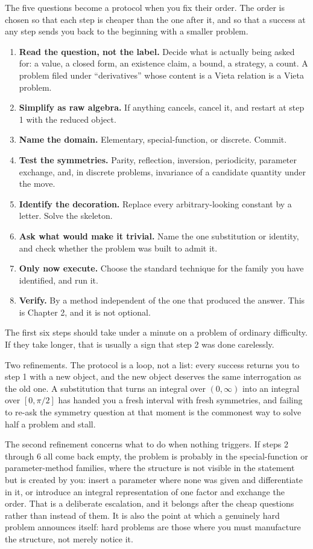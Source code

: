 The five questions become a protocol when you fix their order. The order is chosen so that each step is cheaper than the one after it, and so that a success at any step sends you back to the beginning with a smaller problem.

\begin{enumerate}
\item \textbf{Read the question, not the label.} Decide what is actually being asked for: a value, a closed form, an existence claim, a bound, a strategy, a count. A problem filed under ``derivatives'' whose content is a Vieta relation is a Vieta problem.
\item \textbf{Simplify as raw algebra.} If anything cancels, cancel it, and restart at step 1 with the reduced object.
\item \textbf{Name the domain.} Elementary, special-function, or discrete. Commit.
\item \textbf{Test the symmetries.} Parity, reflection, inversion, periodicity, parameter exchange, and, in discrete problems, invariance of a candidate quantity under the move.
\item \textbf{Identify the decoration.} Replace every arbitrary-looking constant by a letter. Solve the skeleton.
\item \textbf{Ask what would make it trivial.} Name the one substitution or identity, and check whether the problem was built to admit it.
\item \textbf{Only now execute.} Choose the standard technique for the family you have identified, and run it.
\item \textbf{Verify.} By a method independent of the one that produced the answer. This is Chapter 2, and it is not optional.
\end{enumerate}

The first six steps should take under a minute on a problem of ordinary difficulty. If they take longer, that is usually a sign that step 2 was done carelessly.

Two refinements. The protocol is a loop, not a list: every success returns you to step 1 with a new object, and the new object deserves the same interrogation as the old one. A substitution that turns an integral over $(0,\infty)$ into an integral over $[0,\pi/2]$ has handed you a fresh interval with fresh symmetries, and failing to re-ask the symmetry question at that moment is the commonest way to solve half a problem and stall.

The second refinement concerns what to do when nothing triggers. If steps 2 through 6 all come back empty, the problem is probably in the special-function or parameter-method families, where the structure is not visible in the statement but is created by you: insert a parameter where none was given and differentiate in it, or introduce an integral representation of one factor and exchange the order. That is a deliberate escalation, and it belongs after the cheap questions rather than instead of them. It is also the point at which a genuinely hard problem announces itself: hard problems are those where you must manufacture the structure, not merely notice it.

